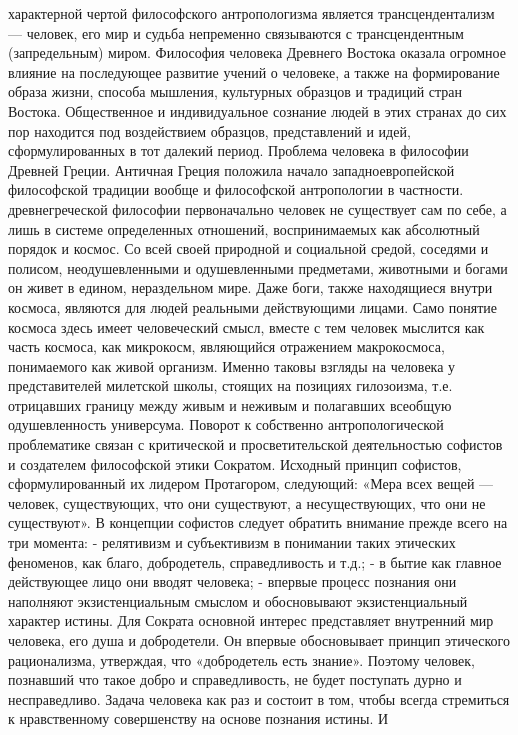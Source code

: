 \documentclass[12pt]{article}
\begin{document}
характерной чертой философского антропологизма является трансцендентализм — человек, его мир и судьба
непременно связываются с трансцендентным (запредельным) миром.
Философия человека Древнего Востока оказала огромное влияние на последующее развитие учений о человеке,
а также на формирование образа жизни, способа мышления, культурных образцов и традиций стран Востока.
Общественное и индивидуальное сознание людей в этих странах до сих пор находится под воздействием
образцов, представлений и идей, сформулированных в тот далекий период.
Проблема человека в философии Древней Греции.
Античная Греция положила начало западноевропейской философской традиции вообще и философской
антропологии в частности. древнегреческой философии первоначально человек не существует сам по себе, а
лишь в системе определенных отношений, воспринимаемых как абсолютный порядок и космос. Со всей своей
природной и социальной средой, соседями и полисом, неодушевленными и одушевленными предметами,
животными и богами он живет в едином, нераздельном мире. Даже боги, также находящиеся внутри космоса,
являются для людей реальными действующими лицами. Само понятие космоса здесь имеет человеческий
смысл, вместе с тем человек мыслится как часть космоса, как микрокосм, являющийся отражением
макрокосмоса, понимаемого как живой организм. Именно таковы взгляды на человека у представителей
милетской школы, стоящих на позициях гилозоизма, т.е. отрицавших границу между живым и неживым и
полагавших всеобщую одушевленность универсума.
Поворот к собственно антропологической проблематике связан с критической и просветительской
деятельностью софистов и создателем философской этики Сократом.
Исходный принцип софистов, сформулированный их лидером Протагором, следующий: «Мера всех вещей —
человек, существующих, что они существуют, а несуществующих, что они не существуют».
В концепции софистов следует обратить внимание прежде всего на три момента:
- релятивизм и субъективизм в понимании таких этических феноменов, как благо, добродетель, справедливость 
и т.д.;
- в бытие как главное действующее лицо они вводят человека;
- впервые процесс познания они наполняют экзистенциальным смыслом и обосновывают экзистенциальный
характер истины.
Для Сократа основной интерес представляет внутренний мир человека, его душа и добродетели. Он впервые
обосновывает принцип этического рационализма, утверждая, что «добродетель есть знание». Поэтому человек,
познавший что такое добро и справедливость, не будет поступать дурно и несправедливо. Задача человека как
раз и состоит в том, чтобы всегда стремиться к нравственному совершенству на основе познания истины. И
\end{document}

